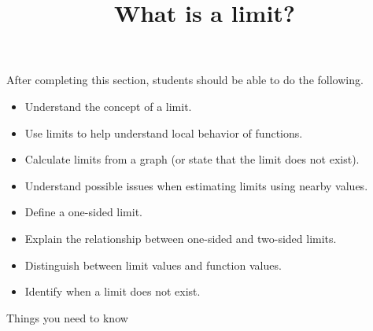 \documentclass{ximera}
\title{What is a limit?}
\begin{document}
\begin{abstract}
\end{abstract}

\maketitle

\begin{sectionOutcomes}
After completing this section, students should be able to do the following.

\begin{itemize}
	\item Understand the concept of a limit.
    \item Use limits to help understand local behavior of functions.
	\item Calculate limits from a graph (or state that the limit does not exist).
	\item Understand possible issues when estimating limits using
          nearby values.
	\item Define a one-sided limit.
	\item Explain the relationship between one-sided and two-sided limits.
	\item Distinguish between limit values and function values.
	\item Identify when a limit does not exist.
\end{itemize}
\end{sectionOutcomes}

Things you need to know
\end{document}
